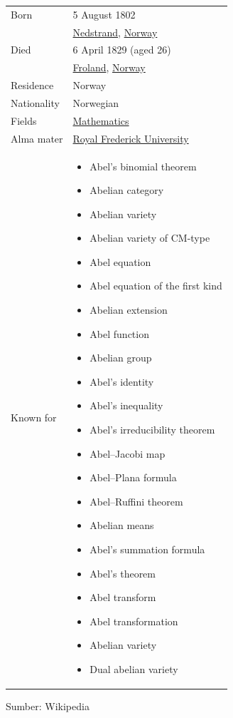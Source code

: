\documentclass{article}
\begin{document}
\begin{tabular}{ll}
Born & 5 August 1802 \\
& \href{https://en.wikipedia.org/wiki/Nedstrand}{Nedstrand}, \href{https://en.wikipedia.org/wiki/Norway}{Norway} \\
Died & 6 April 1829 (aged 26) \\
& \href{https://en.wikipedia.org/wiki/Froland}{Froland}, \href{https://en.wikipedia.org/wiki/Norway}{Norway} \\
Residence & Norway \\
Nationality & Norwegian \\
Fields & \href{https://en.wikipedia.org/wiki/Mathematics}{Mathematics} \\
Alma mater & \href{https://en.wikipedia.org/wiki/Royal_Frederick_University}{Royal Frederick University} \\
Known for & \begin{itemize}
\item Abel's binomial theorem
\item Abelian category
\item Abelian variety
\item Abelian variety of CM-type
\item Abel equation
\item Abel equation of the first kind
\item Abelian extension
\item Abel function
\item Abelian group
\item Abel's identity
\item Abel's inequality
\item Abel's irreducibility theorem
\item Abel--Jacobi map
\item Abel--Plana formula
\item Abel--Ruffini theorem
\item Abelian means
\item Abel's summation formula
\item Abel's theorem
\item Abel transform
\item Abel transformation
\item Abelian variety
\item Dual abelian variety
\end{itemize}
\end{tabular}

Sumber: Wikipedia
\end{document}
